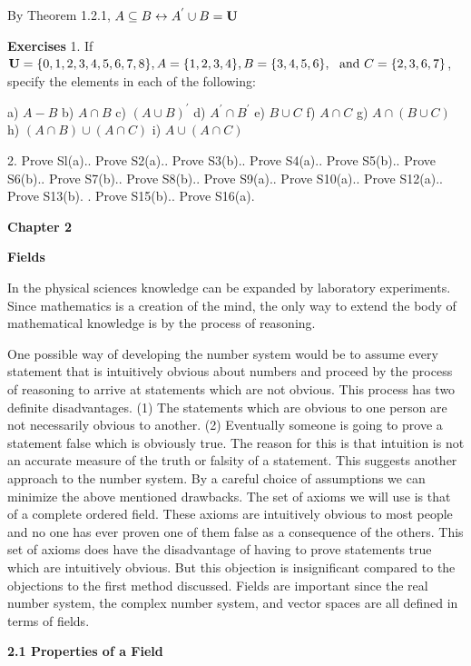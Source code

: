 \begin{large}
By Theorem 1.2.1, $ A \subseteq B \leftrightarrow A^{'}\cup B = \textbf{U}$
\newpage

\textbf{Exercises}
1. If $\textbf{U} = \{0, 1, 2,3,4,5,6,7, 8\}, A= \{1, 2,3,4 \}, B= \{3, 4,5, 6\},\text{~ and~} C= \{2, 3, 6, 7\}$, specify the elements in each of the following: \nl

a) $A-B$\nl
b) $A \cap B$\nl
c) $(A \cup B)^{'}$\nl
d) $A^{'} \cap B^{'}$\nl
e) $B \cup C$\nl
f) $A \cap C$\nl
g) $A \cap (B \cup C)$\nl
h) $(A \cap B) \cup (A\cap C)$\nl
i) $A\cup (A \cap C)$\nl

2. Prove Sl(a).. Prove S2(a).. Prove S3(b).. Prove S4(a).. Prove S5(b).. Prove S6(b).. Prove S7(b).. Prove S8(b).. Prove S9(a).. Prove S10(a).. Prove S12(a).. Prove S13(b). . Prove S15(b).. Prove S16(a). \nl

\newpage
\textbf{Chapter 2} \nl

\textbf{Fields}\nl

In the physical sciences knowledge can be expanded by laboratory
experiments. Since mathematics is a creation of the mind, the only way
to extend the body of mathematical knowledge is by the process of reasoning. \nl

One possible way of developing the number system would be to assume every statement that is intuitively obvious about numbers and proceed by the process of reasoning to arrive at statements which are not obvious. This process has two definite disadvantages. (1) The statements which are obvious to one person are not necessarily obvious to another.  (2) Eventually someone is going to prove a statement false which is obviously true. The reason for this is that intuition is not an accurate measure of the truth or falsity of a statement.
This suggests another approach to the number system. By a careful choice of assumptions we can minimize the above mentioned drawbacks. The set of axioms we will use is that of a complete ordered field. These axioms are intuitively obvious to most people and no one has ever proven one of them false as a consequence of the others. This set of axioms does have the disadvantage of having to prove statements true which are intuitively obvious. But this objection is insignificant compared to the objections to the first method discussed.
Fields are important since the real number system, the complex number system, and vector spaces are all defined in terms of fields. \nl

\textbf{2.1 Properties of a Field} \nl


\end{large}
